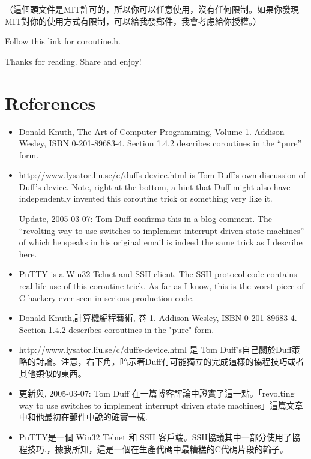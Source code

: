 \documentclass[12pt]{article}
\begin{document}
\begin{CJK}{UTF8}{bsmi}
 （這個頭文件是MIT許可的，所以你可以任意使用，沒有任何限制。如果你發現MIT對你的使用方式有限制，可以給我發郵件，我會考慮給你授權。） 

Follow this link for coroutine.h.

%


Thanks for reading. Share and enjoy!

\section{References}

\begin{itemize}
\item Donald Knuth, The Art of Computer Programming, Volume 1. Addison-Wesley, ISBN 0-201-89683-4. Section 1.4.2 describes coroutines in the ``pure'' form.

\item http://www.lysator.liu.se/c/duffs-device.html is Tom Duff's own discussion of Duff's device. Note, right at the bottom, a hint that Duff might also have independently invented this coroutine trick or something very like it.


Update, 2005-03-07: Tom Duff confirms this in a blog comment. The ``revolting way to use switches to implement interrupt driven state machines'' of which he speaks in his original email is indeed the same trick as I describe here.

\item PuTTY is a Win32 Telnet and SSH client. The SSH protocol code contains real-life use of this coroutine trick. As far as I know, this is the worst piece of C hackery ever seen in serious production code. 

\end{itemize}


\begin{itemize}
\item    Donald Knuth,計算機編程藝術, 卷 1. Addison-Wesley, ISBN 0-201-89683-4. Section 1.4.2 describes coroutines in the "pure" form.
\item        http://www.lysator.liu.se/c/duffs-device.html 是 Tom Duff's自己關於Duff策略的討論。注意，右下角，暗示著Duff有可能獨立的完成這樣的協程技巧或者其他類似的東西。

\item            更新與, 2005-03-07: Tom Duff 在一篇博客評論中證實了這一點。「revolting way to use switches to implement interrupt driven state machines」這篇文章中和他最初在郵件中說的確實一樣.
\item                PuTTY是一個 Win32 Telnet 和 SSH 客戶端。SSH協議其中一部分使用了協程技巧.，據我所知，這是一個在生產代碼中最糟糕的C代碼片段的輪子。
\end{itemize}





\end{CJK}
\end{document}
